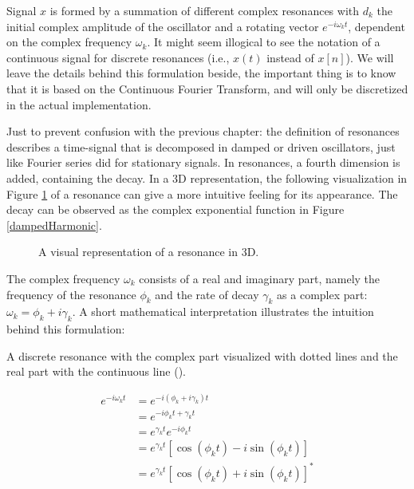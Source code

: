 Signal $x$ is formed by a summation of different complex resonances with $d_k$ the initial complex amplitude of the oscillator and a rotating vector $e^{-i\omega_kt}$, dependent on the complex frequency $\omega_k$. It might seem illogical to see the notation of a continuous signal for discrete resonances (i.e., $x(t)$ instead of $x[n]$). We will leave the details behind this formulation beside, the important thing is to know that it is based on the Continuous Fourier Transform, and will only be discretized in the actual implementation.

Just to prevent confusion with the previous chapter: the definition of resonances describes a time-signal that is decomposed in damped or driven oscillators, just like Fourier series did for stationary signals. In resonances, a fourth dimension is added, containing the decay. In a 3D representation, the following visualization in Figure \ref{fig:resonace3D} of a resonance can give a more intuitive feeling for its appearance. The decay can be observed as the complex exponential function in Figure \ref{dampedHarmonic}.


\begin{figure}[ht]
    \centering
    \vspace{0.3cm}
    \caption{A visual representation of a resonance in 3D.}
    \label{fig:resonace3D}
\end{figure}

The complex frequency $\omega_k$ consists of a real and imaginary part, namely the frequency of the resonance $\phi_k$ and the rate of decay $\gamma_k$ as a complex part: $\omega_k = \phi_k +i \gamma_k$. A short mathematical interpretation illustrates the intuition behind this formulation: 

\begin{marginfigure}
\centering

\caption{A discrete resonance with the complex part visualized with dotted lines and the real part with the continuous line (\cite{homer_modelling_2023}).}
\label{resonanceComplex} 
\vspace{3cm}
\end{marginfigure}

\begin{equation}
\begin{split}
e^{-i\omega_kt} &= e^{-i(\phi_k + i\gamma_k)t}  \\
&= e^{-i\phi_k t + \gamma_k t} \\
&= e^{\gamma_k t}e^{-i \phi_k t} \\
&= e^{\gamma_k t} [\cos(\phi_k t)-i \sin(\phi_k t)] \\
&= e^{\gamma_k t} [\cos(\phi_k t)+i \sin(\phi_k t)]^*
\end{split}
\end{equation}

